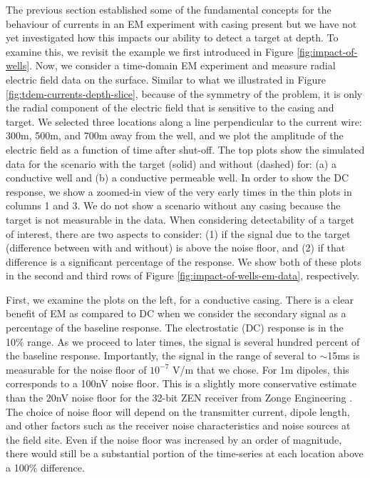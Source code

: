 \documentclass[
    paper
]{geophysics}
\begin{document}
The previous section established some of the fundamental concepts for the behaviour of currents in an EM experiment with casing present but we have not yet investigated how this impacts our ability to detect a target at depth. To examine this, we revisit the example we first introduced in Figure \ref{fig:impact-of-wells}. Now, we consider a time-domain EM experiment and measure radial electric field data on the surface. Similar to what we illustrated in Figure \ref{fig:tdem-currents-depth-slice}, because of the symmetry of the problem, it is only the radial component of the electric field that is sensitive to the casing and target. We selected three locations along a line perpendicular to the current wire: 300m, 500m, and 700m away from the well, and we plot the amplitude of the electric field as a function of time after shut-off. The top plots show the simulated data for the scenario with the target (solid) and without (dashed) for: (a) a conductive well and (b) a conductive permeable well. In order to show the DC response, we show a zoomed-in view of the very early times in the thin plots in columns 1 and 3. We do not show a scenario without any casing because the target is not measurable in the data. When considering detectability of a target of interest, there are two aspects to consider: (1) if the signal due to the target (difference between with and without) is above the noise floor, and (2) if that difference is a significant percentage of the response. We show both of these plots in the second and third rows of Figure \ref{fig:impact-of-wells-em-data}, respectively.

First, we examine the plots on the left, for a conductive casing. There is a clear benefit of EM as compared to DC when we consider the secondary signal as a percentage of the baseline response. The electrostatic (DC) response is in the 10\% range. As we proceed to later times, the signal is several hundred percent of the baseline response. Importantly, the signal in the range of several to $\sim$15ms is measurable for the noise floor of $10^{-7}$ V/m that we chose. For 1m dipoles, this corresponds to a 100nV noise floor. This is a slightly more conservative estimate than the 20nV noise floor for the 32-bit ZEN receiver from Zonge Engineering \citep{Weiss2016}. The choice of noise floor will depend on the transmitter current, dipole length, and other factors such as the receiver noise characteristics and noise sources at the field site. Even if the noise floor was increased by an order of magnitude, there would still be a substantial portion of the time-series at each location above a 100\% difference.
\end{document}
